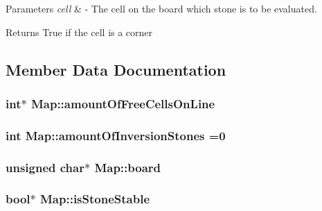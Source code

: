 \begin{DoxyParams}{Parameters}
{\em cell} & -\/ The cell on the board which stone is to be evaluated. \\
\hline
\end{DoxyParams}
\begin{DoxyReturn}{Returns}
True if the cell is a corner 
\end{DoxyReturn}


\subsection{Member Data Documentation}
\subsubsection[{\texorpdfstring{amount\+Of\+Free\+Cells\+On\+Line}{amountOfFreeCellsOnLine}}]{\setlength{\rightskip}{0pt plus 5cm}int$\ast$ Map\+::amount\+Of\+Free\+Cells\+On\+Line\hspace{0.3cm}{\ttfamily [private]}}\hypertarget{class_map_acc4d234b0350f213d7caed1444f914b1}{}\label{class_map_acc4d234b0350f213d7caed1444f914b1}
\subsubsection[{\texorpdfstring{amount\+Of\+Inversion\+Stones}{amountOfInversionStones}}]{\setlength{\rightskip}{0pt plus 5cm}int Map\+::amount\+Of\+Inversion\+Stones =0\hspace{0.3cm}{\ttfamily [private]}}\hypertarget{class_map_a3a47549c5ed4fc948ed55c866ff14c98}{}\label{class_map_a3a47549c5ed4fc948ed55c866ff14c98}
\subsubsection[{\texorpdfstring{board}{board}}]{\setlength{\rightskip}{0pt plus 5cm}unsigned char$\ast$ Map\+::board}\hypertarget{class_map_a028873ce7275713d88fdafd18d427e82}{}\label{class_map_a028873ce7275713d88fdafd18d427e82}
\subsubsection[{\texorpdfstring{is\+Stone\+Stable}{isStoneStable}}]{\setlength{\rightskip}{0pt plus 5cm}bool$\ast$ Map\+::is\+Stone\+Stable\hspace{0.3cm}{\ttfamily [private]}}\hypertarget{class_map_a34d03f1d06e9fbe467fe7d308d0c027a}{}\label{class_map_a34d03f1d06e9fbe467fe7d308d0c027a}
